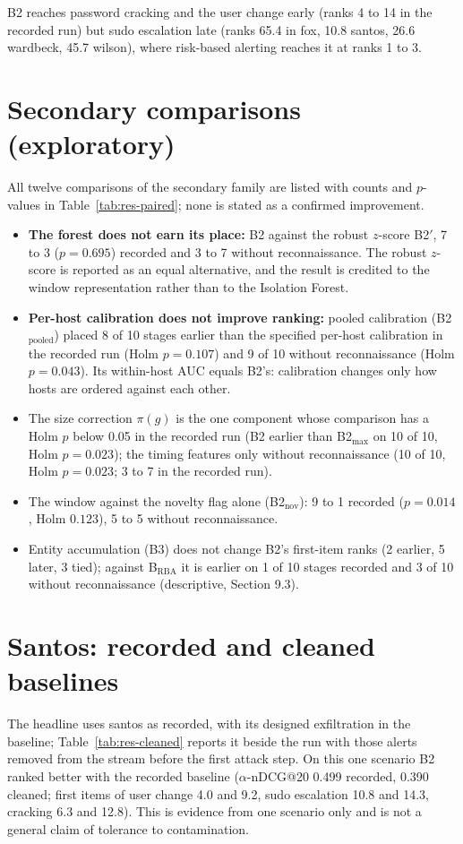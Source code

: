 \documentclass[10pt,a4paper]{article}
\begin{document}
B2 reaches password cracking and the user change early (ranks 4 to 14 in the recorded run) but sudo escalation late (ranks 65.4 in fox, 10.8 santos, 26.6 wardbeck, 45.7 wilson), where risk-based alerting reaches it at ranks 1 to 3.

\clearpage
\section{Secondary comparisons (exploratory)}
All twelve comparisons of the secondary family are listed with counts and $p$-values in Table~\ref{tab:res-paired}; none is stated as a confirmed improvement.
\begin{itemize}
\item \textbf{The forest does not earn its place:} B2 against the robust $z$-score B2$'$, 7 to 3 ($p = 0.695$) recorded and 3 to 7 without reconnaissance. The robust $z$-score is reported as an equal alternative, and the result is credited to the window representation rather than to the Isolation Forest.
\item \textbf{Per-host calibration does not improve ranking:} pooled calibration (B2$_\mathrm{pooled}$) placed 8 of 10 stages earlier than the specified per-host calibration in the recorded run (Holm $p = 0.107$) and 9 of 10 without reconnaissance (Holm $p = 0.043$). Its within-host AUC equals B2's: calibration changes only how hosts are ordered against each other.
\item The size correction $\pi(g)$ is the one component whose comparison has a Holm $p$ below 0.05 in the recorded run (B2 earlier than B2$_\mathrm{max}$ on 10 of 10, Holm $p = 0.023$); the timing features only without reconnaissance (10 of 10, Holm $p = 0.023$; 3 to 7 in the recorded run).
\item The window against the novelty flag alone (B2$_\mathrm{nov}$): 9 to 1 recorded ($p = 0.014$, Holm $0.123$), 5 to 5 without reconnaissance.
\item Entity accumulation (B3) does not change B2's first-item ranks (2 earlier, 5 later, 3 tied); against B$_\mathrm{RBA}$ it is earlier on 1 of 10 stages recorded and 3 of 10 without reconnaissance (descriptive, Section 9.3).
\end{itemize}

\section{Santos: recorded and cleaned baselines}
The headline uses santos as recorded, with its designed exfiltration in the baseline; Table~\ref{tab:res-cleaned} reports it beside the run with those alerts removed from the stream before the first attack step. On this one scenario B2 ranked better with the recorded baseline ($\alpha$-nDCG@20 0.499 recorded, 0.390 cleaned; first items of user change 4.0 and 9.2, sudo escalation 10.8 and 14.3, cracking 6.3 and 12.8). This is evidence from one scenario only and is not a general claim of tolerance to contamination.
\end{document}
